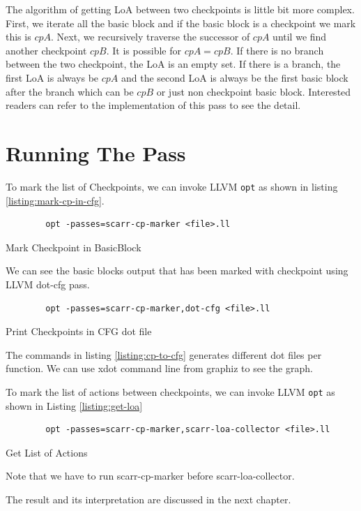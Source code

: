 The algorithm of getting LoA between two checkpoints is little bit more complex. First, we iterate all the basic block and if the basic block is a checkpoint we mark this is $cpA$. Next, we recursively traverse the successor of $cpA$ until we find another checkpoint $cpB$. It is possible for $cpA = cpB$. If there is no branch between the two checkpoint, the LoA is an empty set. If there is a branch, the first LoA is always be $cpA$ and the second LoA is always be the first basic block after the branch \textemdash{} which can be $cpB$ or just non checkpoint basic block. Interested readers can refer to the implementation of this pass to see the detail.

\section{Running The Pass}

To mark the list of Checkpoints, we can invoke LLVM \texttt{opt} as shown in listing \ref{listing:mark-cp-in-cfg}.

\begin{listing}[htbp]
    \begin{verbatim}
        opt -passes=scarr-cp-marker <file>.ll
    \end{verbatim}
    \caption{Mark Checkpoint in BasicBlock}    
    \label{listing:mark-cp-in-cfg}
\end{listing}

We can see the basic blocks output that has been marked with checkpoint using LLVM dot-cfg pass.

\begin{listing}[htbp]
    \begin{verbatim}
        opt -passes=scarr-cp-marker,dot-cfg <file>.ll
    \end{verbatim}
    \caption{Print Checkpoints in CFG dot file}    
    \label{listing:cp-to-cfg}
\end{listing}

The commands in listing \ref{listing:cp-to-cfg} generates different dot files per function. We can use xdot command line from graphiz to see the graph. 

To mark the list of actions between checkpoints, we can invoke LLVM \texttt{opt} as shown in Listing \ref{listing:get-loa}

\begin{listing}
    \begin{verbatim}
        opt -passes=scarr-cp-marker,scarr-loa-collector <file>.ll
    \end{verbatim}
    \caption{Get List of Actions}    
    \label{listing:get-loa}
\end{listing}

Note that we have to run scarr-cp-marker before scarr-loa-collector.

The result and its interpretation are discussed in the next chapter.